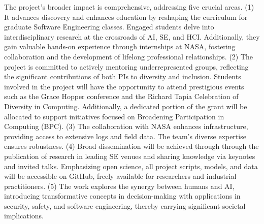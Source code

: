 \documentclass[twoside]{NSF}
\begin{document}
\begin{nsfsummary}

The project's broader impact is comprehensive, addressing five crucial areas. (1) It advances discovery and enhances education by reshaping the curriculum for graduate Software Engineering classes. Engaged students delve into interdisciplinary research at the crossroads of AI, SE, and HCI. Additionally, they gain valuable hands-on experience through internships at NASA, fostering collaboration and the development of lifelong professional relationships. (2) The project is committed to actively mentoring underrepresented groups, reflecting the significant contributions of both PIs to diversity and inclusion. Students involved in the project will have the opportunity to attend prestigious events such as the Grace Hopper conference and the Richard Tapia Celebration of Diversity in Computing. Additionally, a dedicated portion of the grant will be allocated to support initiatives focused on Broadening Participation in Computing (BPC). (3) The collaboration with NASA enhances infrastructure, providing access to extensive logs and field data. The team's diverse expertise ensures robustness. (4) Broad dissemination will be achieved through  through the publication of research in leading SE venues and sharing knowledge via keynotes and invited talks. Emphasizing open science, all project scripts, models, and data will be accessible on GitHub, freely available for researchers and industrial practitioners. (5) The work explores the synergy between humans and AI, introducing transformative concepts in decision-making with applications in security, safety, and software engineering, thereby carrying significant societal implications.


 


\end{nsfsummary}
\end{document}

